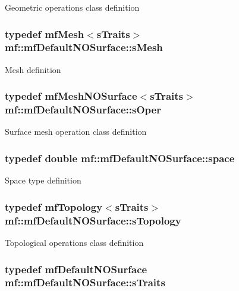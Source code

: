 \label{structmf_1_1mfDefaultNOSurface_abf5459ce8e84b8a2d7635196ee2efe46}
Geometric operations class definition \hypertarget{structmf_1_1mfDefaultNOSurface_ab43f8d1b8feef2cb5af881c7797394e5}{
\subsubsection[{sMesh}]{\setlength{\rightskip}{0pt plus 5cm}typedef {\bf mfMesh}$<${\bf sTraits}$>$ {\bf mf::mfDefaultNOSurface::sMesh}}}
\label{structmf_1_1mfDefaultNOSurface_ab43f8d1b8feef2cb5af881c7797394e5}
Mesh definition \hypertarget{structmf_1_1mfDefaultNOSurface_acec2a5d3a83303d226579c67623e00da}{
\subsubsection[{sOper}]{\setlength{\rightskip}{0pt plus 5cm}typedef {\bf mfMeshNOSurface}$<${\bf sTraits}$>$ {\bf mf::mfDefaultNOSurface::sOper}}}
\label{structmf_1_1mfDefaultNOSurface_acec2a5d3a83303d226579c67623e00da}
Surface mesh operation class definition \hypertarget{structmf_1_1mfDefaultNOSurface_a2b24d2ce49359b64bad77bdd4445b898}{
\subsubsection[{space}]{\setlength{\rightskip}{0pt plus 5cm}typedef double {\bf mf::mfDefaultNOSurface::space}}}
\label{structmf_1_1mfDefaultNOSurface_a2b24d2ce49359b64bad77bdd4445b898}
Space type definition \hypertarget{structmf_1_1mfDefaultNOSurface_a928af564fa895db27f7d9f6db03a535a}{
\subsubsection[{sTopology}]{\setlength{\rightskip}{0pt plus 5cm}typedef {\bf mfTopology}$<${\bf sTraits}$>$ {\bf mf::mfDefaultNOSurface::sTopology}}}
\label{structmf_1_1mfDefaultNOSurface_a928af564fa895db27f7d9f6db03a535a}
Topological operations class definition \hypertarget{structmf_1_1mfDefaultNOSurface_a91330a9e2b3b15a4d53b8ca6b5039cf5}{
\subsubsection[{sTraits}]{\setlength{\rightskip}{0pt plus 5cm}typedef {\bf mfDefaultNOSurface} {\bf mf::mfDefaultNOSurface::sTraits}}}
